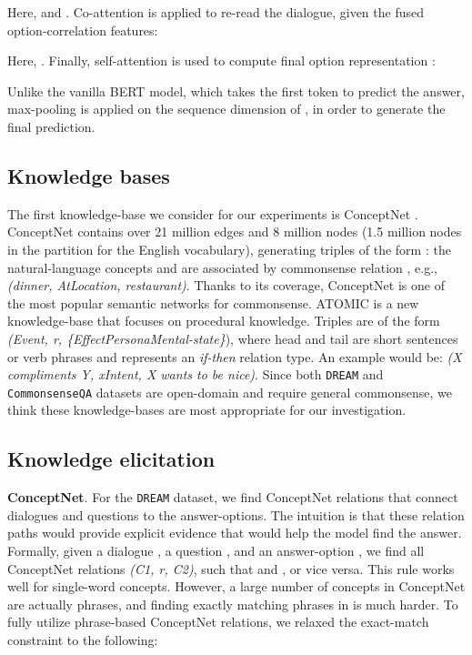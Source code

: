 \documentclass[11pt,a4paper]{article}
\begin{document}
Here,  and . Co-attention \cite{Xiong2016DynamicCN} is applied to re-read the dialogue, given the fused option-correlation features:

Here, . Finally, self-attention \cite{wang-etal-2017-gated} is used to compute final option representation :  


Unlike the vanilla BERT model, which takes the first token to predict the answer, max-pooling is applied on the sequence dimension of , in order to generate the final prediction.

\subsection{Knowledge bases}
The first knowledge-base we consider for our experiments is ConceptNet \cite{speer2016conceptnet}. ConceptNet contains over 21 million edges and 8 million nodes (1.5 million nodes in the partition for the English vocabulary), generating triples of the form : the natural-language concepts  and  are associated by commonsense relation , e.g., \textit{(dinner, AtLocation, restaurant)}. Thanks to its coverage, ConceptNet is one of the most popular semantic networks for commonsense. ATOMIC \cite{sap2019atomic} is a new knowledge-base that focuses on procedural knowledge. Triples are of the form \textit{(Event, r, \{EffectPersonaMental-state\}}), where head and tail are short sentences or verb phrases and  represents an \textit{if-then} relation type. An example would be: \textit{(X compliments Y, xIntent, X wants to be nice)}. Since both \texttt{DREAM} and \texttt{CommonsenseQA} datasets are open-domain and require general commonsense, we think these knowledge-bases are most appropriate for our investigation. 

\subsection{Knowledge elicitation}
\textbf{ConceptNet}. For the \texttt{DREAM} dataset, we find ConceptNet relations that connect dialogues and questions to the answer-options. The intuition is that these relation paths would provide explicit evidence that would help the model find the answer. Formally, given a dialogue , a question , and an answer-option , we find all ConceptNet relations \textit{(C1, r, C2)}, such that  and , or vice versa. This rule works well for single-word concepts. However, a large number of concepts in ConceptNet are actually phrases, and finding exactly matching phrases in  is much harder. To fully utilize phrase-based ConceptNet relations, we relaxed the exact-match constraint to the following:
\end{document}
